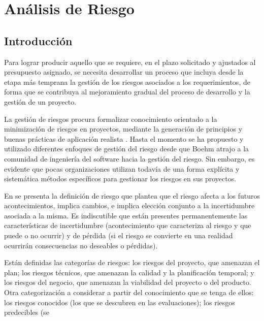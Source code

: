 	\newpage
	
	\section{Análisis de Riesgo}
		\subsection{Introducción}
        Para lograr producir aquello que se requiere, en el plazo solicitado y ajustados al presupuesto asignado, se necesita desarrollar
        un proceso que incluya desde la etapa más temprana la gestión de los riesgos asociados a los requerimientos, de forma que se contribuya al
        mejoramiento gradual del proceso de desarrollo y la gestión de un proyecto.
		\vspace{0.5cm}
		\par
        La gestión de riesgos procura formalizar conocimiento orientado a la minimización de riesgos en proyectos, mediante la
        generación de principios y buenas prácticas de aplicación realista \cite{etiqueta_riegos1}. Hasta el momento se ha propuesto
        y utilizado diferentes enfoques de gestión del riesgo desde que Boehm \cite{etiqueta_riegos2} atrajo a la comunidad de ingeniería del
        software hacia la gestión del riesgo. Sin embargo, es evidente que pocas organizaciones utilizan todavía de una forma explícita y sistemática
        métodos específicos para gestionar los riesgos en sus proyectos.
		\vspace{0.5cm}
		\par
        En \cite{etiqueta_riegos3} se presenta la definición de riesgo que plantea que el riesgo afecta a los futuros acontecimientos, implica
        cambios, e implica elección conjunto a la incertidumbre asociada a la misma. Es indiscutible que están presentes permanentemente las características de
        incertidumbre (acontecimiento que caracteriza al riesgo y que puede o no ocurrir) y de pérdida (si el riesgo se convierte en una realidad
        ocurrirán consecuencias no deseables o pérdidas).
		\vspace{0.5cm}
		\par
		Están definidas las categorías de riesgos: los riesgos del proyecto, que amenazan el plan; los riesgos técnicos, que amenazan la calidad y la
		planificación temporal; y los riesgos del negocio, que amenazan la viabilidad del proyecto o del producto. Otra categorización a considerar a
		partir del conocimiento que se tenga de ellos: los riesgos conocidos (los que se descubren en las evaluaciones); los riesgos predecibles (se
